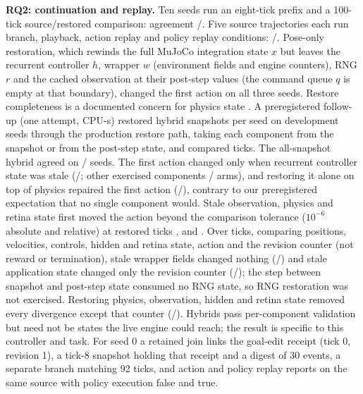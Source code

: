 \documentclass[letterpaper]{article}
\newcommand{\studyinput}[1]{}
\begin{document}
\begin{table}[t]
\centering\small
\caption{Controlled conformance and ablations. R: CPU FLYNN; F: interface fixture; F+: fixture with subprocess
interruption. I/D/L count interface detections, diagnostic comparisons (S1/B2) and study label guards (R1/R2).
C3 alone measures benign false rejection. Diagnostic divergence is not automatic runtime refusal.}
\label{tab:fault}\studyinput{fault-matrix}
\end{table}

\textbf{RQ2: continuation and replay.} Ten seeds run an eight-tick prefix and a 100-tick source/restored comparison:
agreement \ContinuationPassed{}/\ContinuationDeclared{}. Five source trajectories each run branch, playback, action
replay and policy replay conditions: \ReplayPassed{}/\ReplayDeclared{}. Pose-only restoration, which rewinds the full MuJoCo integration state $x$ but leaves the recurrent controller $h$, wrapper $w$ (environment fields and engine counters),
RNG $r$ and the cached observation at their post-step values (the command queue $q$ is empty at that boundary), changed the first action on all three seeds.
Restore completeness is a documented concern for physics state \citep{mujococomputation}. A preregistered follow-up
(one attempt, \CompCPU{} CPU-s) restored \CompArms{} hybrid snapshots per seed on \CompSeeds{} development seeds through
the production restore path, taking each component from the snapshot or from the post-step state, and compared
\CompHorizon{} ticks. The all-snapshot hybrid agreed on \CompValidSeeds{}/\CompSeeds{} seeds. The first action changed only
when recurrent controller state was stale (\CompHiddenNecessary{}/\CompSeeds{}; other exercised components \CompOtherFirstAction{}/\CompOtherFirstActionArms{} arms),
and restoring it alone on top of physics repaired the first action (\CompHiddenRepairs{}/\CompSeeds{}), contrary to our
preregistered expectation that no single component would. Stale observation, physics and retina state first moved the
action beyond the comparison tolerance ($10^{-6}$ absolute and relative) at restored ticks \CompObservationTick{}, \CompPhysicsTick{} and
\CompRetinaTick{}. Over \CompHorizon{} ticks, comparing positions, velocities, controls, hidden and retina state, action and
the revision counter (not reward or termination), stale wrapper fields changed nothing (\CompWrapperClean{}/\CompSeeds{}) and
stale application state changed only the revision counter (\CompApplicationRevisionOnly{}/\CompSeeds{}); the step between snapshot and post-step state consumed no RNG
state, so RNG restoration was not exercised. Restoring physics, observation, hidden and retina state removed every
divergence except that counter (\CompInputsRevisionOnly{}/\CompSeeds{}). Hybrids pass per-component
validation but need not be states the live engine could reach; the result is specific to this controller and task.
For seed 0 a retained join links the goal-edit receipt (tick 0, revision 1), a tick-8 snapshot holding that receipt and
a digest of 30 events, a separate branch matching 92 ticks, and action and policy replay reports on the same source with
policy execution false and true.
\end{document}
